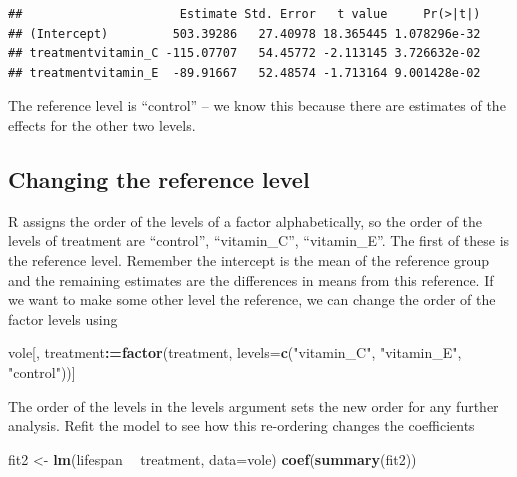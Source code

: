 \documentclass[]{book}
\newenvironment{Shaded}{\begin{snugshade}}{\end{snugshade}}
\newcommand{\DataTypeTok}[1]{\textcolor[rgb]{0.13,0.29,0.53}{#1}}
\newcommand{\ErrorTok}[1]{\textcolor[rgb]{0.64,0.00,0.00}{\textbf{#1}}}
\newcommand{\KeywordTok}[1]{\textcolor[rgb]{0.13,0.29,0.53}{\textbf{#1}}}
\newcommand{\NormalTok}[1]{#1}
\newcommand{\OperatorTok}[1]{\textcolor[rgb]{0.81,0.36,0.00}{\textbf{#1}}}
\newcommand{\StringTok}[1]{\textcolor[rgb]{0.31,0.60,0.02}{#1}}
\begin{document}
\begin{verbatim}
##                      Estimate Std. Error   t value     Pr(>|t|)
## (Intercept)         503.39286   27.40978 18.365445 1.078296e-32
## treatmentvitamin_C -115.07707   54.45772 -2.113145 3.726632e-02
## treatmentvitamin_E  -89.91667   52.48574 -1.713164 9.001428e-02
\end{verbatim}

The reference level is ``control'' -- we know this because there are estimates of the effects for the other two levels.

\hypertarget{changing-the-reference-level}{%
\subsection{Changing the reference level}\label{changing-the-reference-level}}

R assigns the order of the levels of a factor alphabetically, so the order of the levels of treatment are ``control'', ``vitamin\_C'', ``vitamin\_E''. The first of these is the reference level. Remember the intercept is the mean of the reference group and the remaining estimates are the differences in means from this reference. If we want to make some other level the reference, we can change the order of the factor levels using

\begin{Shaded}
\begin{Highlighting}[]
\NormalTok{vole[, treatment}\OperatorTok{:}\ErrorTok{=}\KeywordTok{factor}\NormalTok{(treatment, }
                         \DataTypeTok{levels=}\KeywordTok{c}\NormalTok{(}\StringTok{"vitamin_C"}\NormalTok{, }\StringTok{"vitamin_E"}\NormalTok{, }\StringTok{"control"}\NormalTok{))]}
\end{Highlighting}
\end{Shaded}

The order of the levels in the levels argument sets the new order for any further analysis. Refit the model to see how this re-ordering changes the coefficients

\begin{Shaded}
\begin{Highlighting}[]
\NormalTok{fit2 <-}\StringTok{ }\KeywordTok{lm}\NormalTok{(lifespan }\OperatorTok{~}\StringTok{ }\NormalTok{treatment, }\DataTypeTok{data=}\NormalTok{vole)}
\KeywordTok{coef}\NormalTok{(}\KeywordTok{summary}\NormalTok{(fit2))}
\end{Highlighting}
\end{Shaded}
\end{document}

